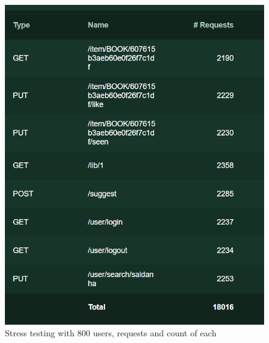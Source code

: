 \documentclass[oneside]{article}
\begin{document}
\begin{figure}[H]
  \centering
  \includegraphics[width=\textwidth]{ tests/locust.png }
  \caption{Stress testing with 800 users, requests and count of each}
\end{figure}
\end{document}
